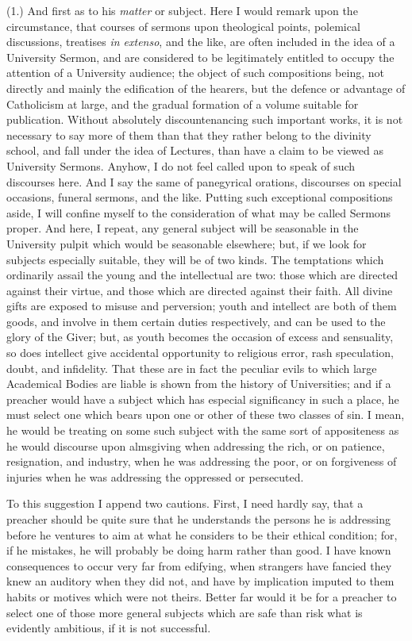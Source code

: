 (1.) And first as to his \emph{matter} or subject. Here I would
remark upon the circumstance, that courses of sermons upon theological
points, polemical discussions, treatises \emph{in extenso}, and the
like, are often included in the idea of a University Sermon, and
are considered to be legitimately entitled to occupy the attention of
a University audience; the object of such compositions being, not
directly and mainly the edification of the hearers, but the defence or
advantage of Catholicism at large, and the gradual formation of a
volume suitable for publication. Without absolutely discountenancing
such important works, it is not necessary to say more of them than
that they rather belong to the divinity school, and fall under the
idea of Lectures, than have a claim to be viewed as University
Sermons. Anyhow, I do not feel called upon to speak of such discourses
here. And I say the same of panegyrical orations, discourses on
special occasions, funeral sermons, and the like. Putting such
exceptional compositions aside, I will confine myself to the
consideration of what may be called Sermons proper. And here, I
repeat, any general subject will be seasonable in the University
pulpit which would be seasonable elsewhere; but, if we look for
subjects especially suitable, they will be of two kinds. The
temptations which ordinarily assail the young and the intellectual are
two: those which are directed against their virtue, and those which
are directed against their faith. All divine gifts are exposed to
misuse and perversion; youth and intellect are both of them goods, and
involve in them certain duties respectively, and can be used to the
glory of the Giver; but, as youth becomes the occasion of excess and
sensuality, so does intellect give accidental opportunity to religious
error, rash speculation, doubt, and infidelity. That these are in fact
the peculiar evils to which large Academical Bodies are liable is
shown from the history of Universities; and if a preacher would have a
subject which has especial significancy in such a place, he must
select one which bears upon one or other of these two classes of
sin. I mean, he would be treating on some such subject with the same
sort of appositeness as he would discourse upon almsgiving when
addressing the rich, or on patience, resignation, and industry, when
he was addressing the poor, or on forgiveness of injuries when he was
addressing the oppressed or persecuted.

To this suggestion I append two cautions. First, I need hardly say,
that a preacher should be quite sure that he understands the persons
he is addressing before he ventures to aim at what he considers to be
their ethical condition; for, if he mistakes, he will probably be
doing harm rather than good. I have known consequences to occur very
far from edifying, when strangers have fancied they knew an auditory
when they did not, and have by implication imputed to them habits or
motives which were not theirs. Better far would it be for a preacher
to select one of those more general subjects which are safe than risk
what is evidently ambitious, if it is not successful.


